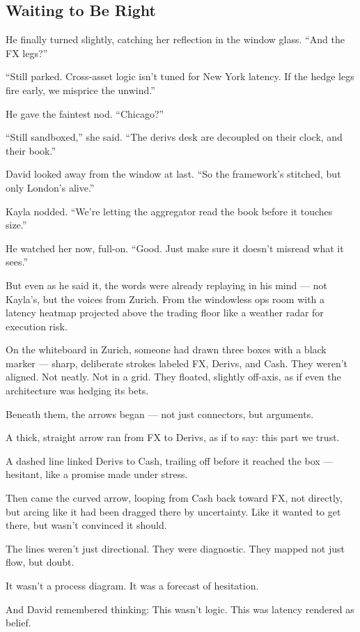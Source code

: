 \subsection{Waiting to Be Right}

He finally turned slightly, catching her reflection in the window glass.
“And the FX legs?”

“Still parked. Cross-asset logic isn’t tuned for New York latency. If the hedge legs fire early, we misprice the unwind.”

He gave the faintest nod.
“Chicago?”

“Still sandboxed,” she said. “The derivs desk are decoupled on their clock, and their book.”

David looked away from the window at last.
“So the framework’s stitched, but only London’s alive.”

Kayla nodded.
“We’re letting the aggregator read the book before it touches size.”

He watched her now, full-on.
“Good. Just make sure it doesn’t misread what it sees.”

But even as he said it, the words were already replaying in his mind —
not Kayla’s, but the voices from Zurich.
From the windowless ops room with a latency heatmap projected above the trading floor like a weather 
radar for execution risk.

On the whiteboard in Zurich, someone had drawn three boxes with a black marker — sharp, deliberate strokes labeled FX, Derivs, 
and Cash. They weren’t aligned. Not neatly. Not in a grid.
They floated, slightly off-axis, as if even the architecture was hedging its bets.

Beneath them, the arrows began — not just connectors, but arguments.

A thick, straight arrow ran from FX to Derivs, as if to say: this part we trust.

A dashed line linked Derivs to Cash, trailing off before it reached the box — hesitant, like a promise made under stress.

Then came the curved arrow, looping from Cash back toward FX, not directly, but arcing like it had been dragged there by uncertainty. Like it wanted to get there, but wasn’t convinced it should.

The lines weren’t just directional.
They were diagnostic.
They mapped not just flow, but doubt.

It wasn’t a process diagram.
It was a forecast of hesitation.

And David remembered thinking:
This wasn’t logic. This was latency rendered as belief.

